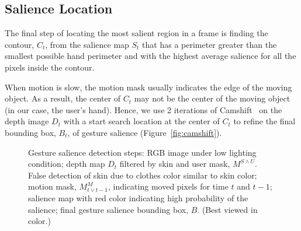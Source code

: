 \documentclass{acm_proc_article-sp}
\begin{document}
\subsection{Salience Location}
The final step of locating the most salient region in a frame is finding the
contour, $C_t$, from the salience map $S_t$ that has a perimeter greater than
the smallest possible hand perimeter and with the highest average salience for all the pixels inside the contour.

When motion is slow, the motion mask usually indicates the edge of the moving
object. As a result, the center of $C_t$ may not be the center of the moving
object (in our case, the user's hand). Hence, we use 2 iterations of Camshift~\cite{Bradski98} on the depth image $D_t$ with a start search location at the center of $C_t$ to refine
the final bounding box, $B_t$, of gesture salience (Figure~\ref{fig:camshift}).

\begin{figure}[tb]
\centering
\hspace{-0.6em}%
\caption{Gesture salience detection steps:  RGB image under low lighting condition;
 depth map $D_t$ filtered by skin and user mask, $M^{S\wedge U}$. False detection of skin due to
clothes color similar to skin color;  motion mask,  $M_{t\vee t-1}^M$, indicating moved pixels for time $t$ and $t-1$;
 salience map with red color indicating high probability of the salience; 
 final gesture salience bounding box, $B$. (Best viewed in
color.)}
\label{fig:gesture-salience}
\end{figure}
\end{document}
